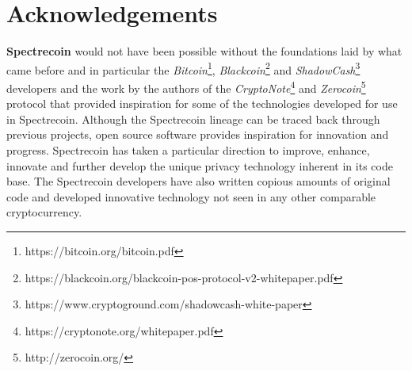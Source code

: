 \chapter{Acknowledgements}
\textbf{Spectrecoin} would not have been possible without the foundations laid by what came before and in particular the \textit{Bitcoin}\footnote{https://bitcoin.org/bitcoin.pdf}, \textit{Blackcoin}\footnote{https://blackcoin.org/blackcoin-pos-protocol-v2-whitepaper.pdf} and \textit{ShadowCash}\footnote{https://www.cryptoground.com/shadowcash-white-paper} developers and the work by the authors of the \textit{CryptoNote}\footnote{https://cryptonote.org/whitepaper.pdf} and \textit{Zerocoin}\footnote{http://zerocoin.org/} protocol that provided inspiration for some of the technologies developed for use in Spectrecoin. Although the Spectrecoin lineage can be traced back through previous projects, open source software provides inspiration for innovation and progress. Spectrecoin has taken a particular direction to improve, enhance, innovate and further develop the unique privacy technology inherent in its code base. The Spectrecoin developers have also written copious amounts of original code and developed innovative technology not seen in any other comparable cryptocurrency. 
